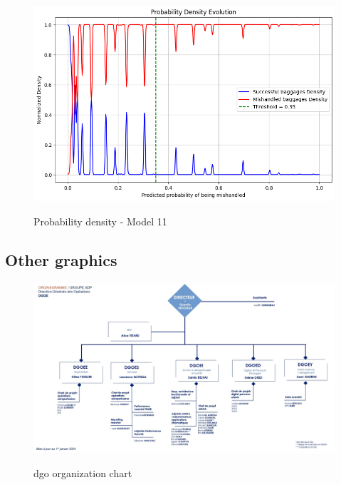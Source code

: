 \documentclass[12pt]{article}
\begin{document}
\begin{figure}
\begin{minipage}[c]{0.5\linewidth}
    \includegraphics[width=1\textwidth]{Probability_density_Model 11.png}\\
    \caption{Probability density - Model 11}
\end{minipage}
\hfill
\begin{minipage}[c]{0.5\linewidth}
\end{minipage}%
\end{figure}
\FloatBarrier





\newpage
\subsection*{Other graphics}



\FloatBarrier
\begin{figure}[h]
    \includegraphics[width=1\textwidth]{organigramme_DGO.jpg}\\
    \caption{\acrshort{dgo} organization chart}
    \label{fig:DGO organization chart}
\end{figure}
\FloatBarrier
\end{document}

